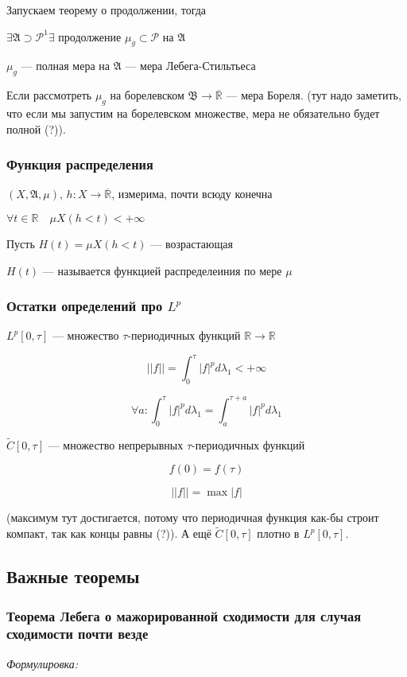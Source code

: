 \documentclass{article}
\def\rinf{\overline{\mathbb{R}}}
\begin{document}
Запускаем теорему о продолжении, тогда

$\exists \mathfrak{A} \supset \mathcal{P}^{1} \exists$ продолжение $\mu_g \subset \mathcal{P}$ на $\mathfrak{A}$

$\mu_g$ --- полная мера на $\mathfrak{A}$ --- мера Лебега-Стильтьеса

Если рассмотреть $\mu_g$ на борелевском $\mathfrak{B} \rightarrow \rinf$ --- мера Бореля. (тут надо заметить, что если мы запустим на борелевском множестве, мера не обязательно будет полной (?)).


\subsubsection{Функция распределения}
$(X, \mathfrak{A}, \mu)$, $h: X \rightarrow \rinf$, измерима, почти всюду конечна

$\forall t \in \mathbb{R} \quad \mu X(h < t) < +\infty$

Пусть $H(t) = \mu X(h < t)$ --- возрастающая

$H(t)$ --- называется функцией распределеиния по мере $\mu$

\subsubsection{Остатки определений про $L^p$}

$L^p[0, \tau]$ --- множество $\tau$-периодичных функций $\mathbb{R} \rightarrow \mathbb{R}$

\[||f|| = \int_0^{\tau} |f|^p d\lambda_1 < +\infty\]

\[\forall a : \int_0^{\tau} |f|^p d\lambda_1 = \int_a^{\tau + a} |f|^p d\lambda_1\]

$\tilde{C}[0, \tau]$ --- множество непрерывных $\tau$-периодичных функций

\[f(0) = f(\tau)\]

\[||f|| = \max{|f|}\]

(максимум тут достигается, потому что периодичная функция как-бы строит компакт, так как концы равны (?)). А ещё $\tilde{C}[0, \tau]$ плотно в $L^p[0, \tau]$.

\newpage

\subsection{Важные теоремы}

\subsubsection{Теорема Лебега о мажорированной сходимости для случая сходимости почти везде}
\textit{Формулировка:}
\end{document}

